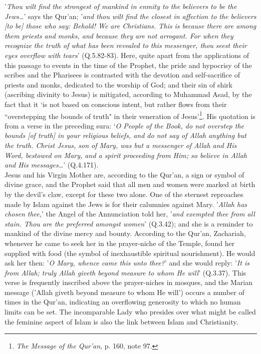 \documentclass[10pt, twoside]{book}
\begin{document}
'\emph{Thou wilt find the strongest of mankind in enmity to the believers to be the Jews\ldots{}}' says the 
Qur'an; '\emph{and thou wilt find the closest in affection to the believers [to be] those who say: Behold! 
We are Christians. This is because there are among them priests and monks, and because they are not 
arrogant. For when they recognize the truth of what has been revealed to this messenger, thou seest 
their eyes overflow with tears}' (Q.5.82-83). Here, quite apart from the applications of this passage 
to events in the time of the Prophet, the pride and hypocrisy of the scribes and the Pharisees is 
contrasted with the devotion and self\hyp{}sacrifice of priests and monks, dedicated to the worship of 
God; and their sin of shirk (ascribing divinity to Jesus) is mitigated, according to Muhammad Asad, 
by the fact that it `is not based on conscious intent, but rather flows from their ``overstepping the 
bounds of truth" in their veneration of Jesus'\footnote{\emph{The Message of the Qur'an}, p. 160, note 97.}. His quotation is from a verse in the preceding sura: `\emph{O People of the Book, do not overstep the bounds [of truth] in your religious beliefs, and do not say of Allah anything but the truth. Christ Jesus, son of Mary, was but a messenger of Allah and His Word, bestowed on Mary, and a spirit proceeding from Him; so believe in Allah and His messages\ldots{}}' (Q.4.171). \\

Jesus and his Virgin Mother are, according to the Qur'an, a sign or symbol of divine grace, and the 
Prophet said that all men and women were marked at birth by the devil's claw, except for these two 
alone. One of the sternest reproaches made by Islam against the Jews is for their calumnies against 
Mary. '\emph{Allah has chosen thee,}' the Angel of the Annunciation told her, '\emph{and exempted thee from all stain. Thou are the preferred amongst women}' (Q.3.42); and she is a reminder to mankind of the divine mercy and bounty. According to the Qur'an, Zachariah, whenever he came to seek her in the prayer\hyp{}niche of the Temple, found her supplied with food (the symbol of inexhaustible spiritual 
nourishment). He would ask her then: '\emph{O Mary, whence came this unto thee?}' and she would reply: '\emph{It is from Allah; truly Allah giveth beyond measure to whom He will}' (Q.3.37). This verse is frequently inscribed above the prayer\hyp{}niches in mosques, and the Marian message ('Allah giveth beyond measure to whom He will') occurs a number of times in the Qur'an, indicating an overflowing generosity to which no human limits can be set. The incomparable Lady who presides over what might be called the feminine aspect of Islam is also the link between Islam and Christianity. \\
\end{document}
